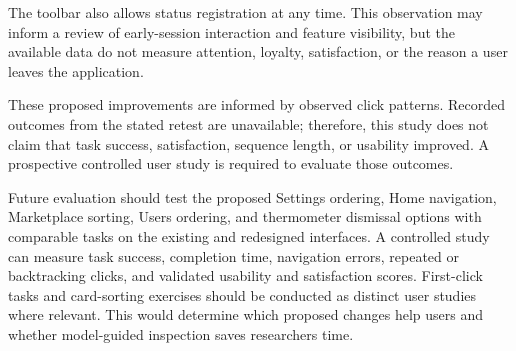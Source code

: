 \documentclass[sn-mathphys-num, Numbered]{sn-jnl}%
\theoremstyle{thmstyleone}%
\theoremstyle{thmstyletwo}%
\theoremstyle{thmstylethree}%
\providecommand{\DIFadd}[1]{{\protect\color{green!40!black}#1}} %
\providecommand{\DIFdel}[1]{}                      %
\providecommand{\DIFaddbegin}{} %
\providecommand{\DIFaddend}{} %
\providecommand{\DIFdelbegin}{} %
\providecommand{\DIFdelend}{} %
\newcommand{\DIFscaledelfig}{0.5}
\newlength{\DIFdelgraphicswidth} %
\newlength{\DIFdelgraphicsheight} %
\newcommand{\DIFaddincludegraphics}[2][]{{\color{blue}\fbox{\DIFOincludegraphics[#1]{#2}}}} %
\newcommand{\DIFdelincludegraphics}[2][]{%
\sbox{\DIFdelgraphicsbox}{\DIFOincludegraphics[#1]{#2}}%
\settoboxwidth{\DIFdelgraphicswidth}{\DIFdelgraphicsbox} %
\settoboxtotalheight{\DIFdelgraphicsheight}{\DIFdelgraphicsbox} %
\scalebox{\DIFscaledelfig}{%
\parbox[b]{\DIFdelgraphicswidth}{\usebox{\DIFdelgraphicsbox}\\[-\baselineskip] \rule{\DIFdelgraphicswidth}{0em}}\llap{\resizebox{\DIFdelgraphicswidth}{\DIFdelgraphicsheight}{%
\setlength{\unitlength}{\DIFdelgraphicswidth}%
\begin{picture}(1,1)%
\thicklines\linethickness{2pt} %
{\color[rgb]{1,0,0}\put(0,0){\framebox(1,1){}}}%
{\color[rgb]{1,0,0}\put(0,0){\line( 1,1){1}}}%
{\color[rgb]{1,0,0}\put(0,1){\line(1,-1){1}}}%
\end{picture}%
}\hspace*{3pt}}} %
} %
\DeclareRobustCommand{\DIFaddbegin}{\DIFOaddbegin \let\includegraphics\DIFaddincludegraphics} %
\DeclareRobustCommand{\DIFaddend}{\DIFOaddend \let\includegraphics\DIFOincludegraphics} %
\DeclareRobustCommand{\DIFdelbegin}{\DIFOdelbegin \let\includegraphics\DIFdelincludegraphics} %
\DeclareRobustCommand{\DIFdelend}{\DIFOaddend \let\includegraphics\DIFOincludegraphics} %
\begin{document}
\DIFdelbegin \DIFdel{Additionally, on the toolbar at the top of the app, users have the option to register their status }\DIFdelend \DIFaddbegin \DIFadd{The toolbar also allows status registration }\DIFaddend at any time. This \DIFdelbegin \DIFdel{demonstrates that users might even exit the app with a single click and not return, which is why in marketing and increasing customer loyalty, the app needs to be designed in a way that captures the user 's attention and meets their needs as quickly as possible during their first interaction}\DIFdelend \DIFaddbegin \DIFadd{observation may inform a review of early-session interaction and feature visibility, but the available data do not measure attention, loyalty, satisfaction, or the reason a user leaves the application}\DIFaddend .

\DIFdelbegin \DIFdel{Finally, after retesting with some users and evaluating them, it was determined that the scenarios and user interaction flows with the app had improved, the length of the sequences had decreased, and the user flows had become less complex compared to before. }\DIFdelend \DIFaddbegin \DIFadd{These proposed improvements are informed by observed click patterns. Recorded outcomes from the stated retest are unavailable; therefore, this study does not claim that task success, satisfaction, sequence length, or usability improved. A prospective controlled user study is required to evaluate those outcomes.
}\DIFaddend 

\DIFaddbegin \DIFadd{Future evaluation should test the proposed Settings ordering, Home navigation, Marketplace sorting, Users ordering, and thermometer dismissal options with comparable tasks on the existing and redesigned interfaces. A controlled study can measure task success, completion time, navigation errors, repeated or backtracking clicks, and validated usability and satisfaction scores. First-click tasks and card-sorting exercises should be conducted as distinct user studies where relevant. This would determine which proposed changes help users and whether model-guided inspection saves researchers time.
}
\end{document}
